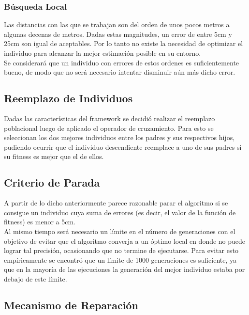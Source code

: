 \documentclass[journal]{IEEEtran}
\begin{document}
\subsubsection{Búsqueda Local}

Las distancias con las que se trabajan son del orden de unos pocos metros a algunas decenas de metros. Dadas estas magnitudes, un error de entre 5cm y 25cm son igual de aceptables. Por lo tanto no existe la necesidad de optimizar el individuo para alcanzar la mejor estimación posible en su entorno.\\

Se considerará que un individuo con errores de estos ordenes es suficientemente bueno, de modo que no será necesario intentar disminuir aún más dicho error.\\

\subsection{Reemplazo de Individuos}

Dadas las características del framework se decidió realizar el reemplazo poblacional luego de aplicado el operador de cruzamiento. Para esto se seleccionan los dos mejores individuos entre los padres y sus respectivos hijos, pudiendo ocurrir que el individuo descendiente reemplace a uno de sus padres si su fitness es mejor que el de ellos.\\

\subsection{Criterio de Parada}

A partir de lo dicho anteriormente parece razonable parar el algoritmo si se consigue un individuo cuya suma de errores (es decir, el valor de la función de fitness) es menor a 5cm.\\

Al mismo tiempo será necesario un límite en el número de generaciones con el objetivo de evitar que el algoritmo converja a un óptimo local en donde no puede lograr tal precisión, ocasionando que no termine de ejecutarse. Para evitar esto empíricamente se encontró que un límite de 1000 generaciones es suficiente, ya que en la mayoría de las ejecuciones la generación del mejor individuo estaba por debajo de este límite.\\

\subsection{Mecanismo de Reparación}
\end{document}
